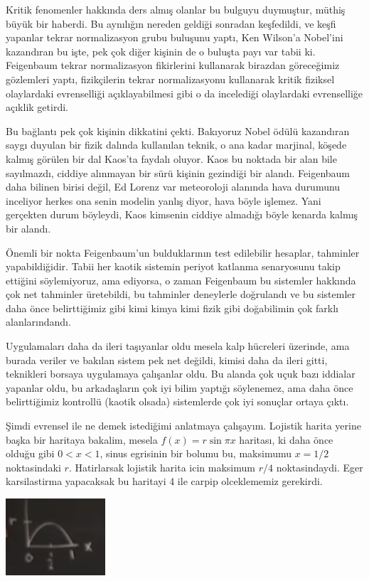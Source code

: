 \documentclass[12pt,fleqn]{article}\usepackage{../../common}
\begin{document}
Kritik fenomenler hakkında ders almış olanlar bu bulguyu duymuştur, müthiş büyük
bir haberdi. Bu aynılığın nereden geldiği sonradan keşfedildi, ve keşfi yapanlar
tekrar normalizasyon grubu buluşunu yaptı, Ken Wilson'a Nobel'ini kazandıran bu
işte, pek çok diğer kişinin de o buluşta payı var tabii ki. Feigenbaum tekrar
normalizasyon fikirlerini kullanarak birazdan göreceğimiz gözlemleri yaptı,
fizikçilerin tekrar normalizasyonu kullanarak kritik fiziksel olaylardaki
evrenselliği açıklayabilmesi gibi o da incelediği olaylardaki evrenselliğe
açıklik getirdi.

Bu bağlantı pek çok kişinin dikkatini çekti. Bakıyoruz Nobel ödülü kazandıran
saygı duyulan bir fizik dalında kullanılan teknik, o ana kadar marjinal, köşede
kalmış görülen bir dal Kaos'ta faydalı oluyor. Kaos bu noktada bir alan bile
sayılmazdı, ciddiye alınmayan bir sürü kişinin gezindiği bir alandı. Feigenbaum
daha bilinen birisi değil, Ed Lorenz var meteoroloji alanında hava durumunu
inceliyor herkes ona senin modelin yanlış diyor, hava böyle işlemez. Yani
gerçekten durum böyleydi, Kaos kimsenin ciddiye almadığı böyle kenarda kalmış
bir alandı. 

Önemli bir nokta Feigenbaum'un bulduklarının test edilebilir hesaplar, tahminler
yapabildiğidir. Tabii her kaotik sistemin periyot katlanma senaryosunu takip
ettiğini söylemiyoruz, ama ediyorsa, o zaman Feigenbaum bu sistemler hakkında
çok net tahminler üretebildi, bu tahminler deneylerle doğrulandı ve bu sistemler
daha önce belirttiğimiz gibi kimi kimya kimi fizik gibi doğabilimin çok farklı
alanlarındandı.

Uygulamaları daha da ileri taşıyanlar oldu mesela kalp hücreleri üzerinde, ama
burada veriler ve bakılan sistem pek net değildi, kimisi daha da ileri gitti,
teknikleri borsaya uygulamaya çalışanlar oldu. Bu alanda çok uçuk bazı iddialar
yapanlar oldu, bu arkadaşların çok iyi bilim yaptığı söylenemez, ama daha önce
belirttiğimiz kontrollü (kaotik olsada) sistemlerde çok iyi sonuçlar ortaya
çıktı.

Şimdi evrensel ile ne demek istediğimi anlatmaya çalışayım. Lojistik harita
yerine başka bir haritaya bakalim, mesela $f(x) = r \sin \pi x$ haritası, ki
daha önce olduğu gibi $0 < x < 1$, sinus egrisinin bir bolumu bu, maksimumu
$x=1/2$ noktasindaki $r$. Hatirlarsak lojistik harita icin maksimum $r/4$
noktasindaydi. Eger karsilastirma yapacaksak bu haritayi 4 ile carpip
olceklememiz gerekirdi. 

\includegraphics[width=10em]{20_03.png}
\end{document}
